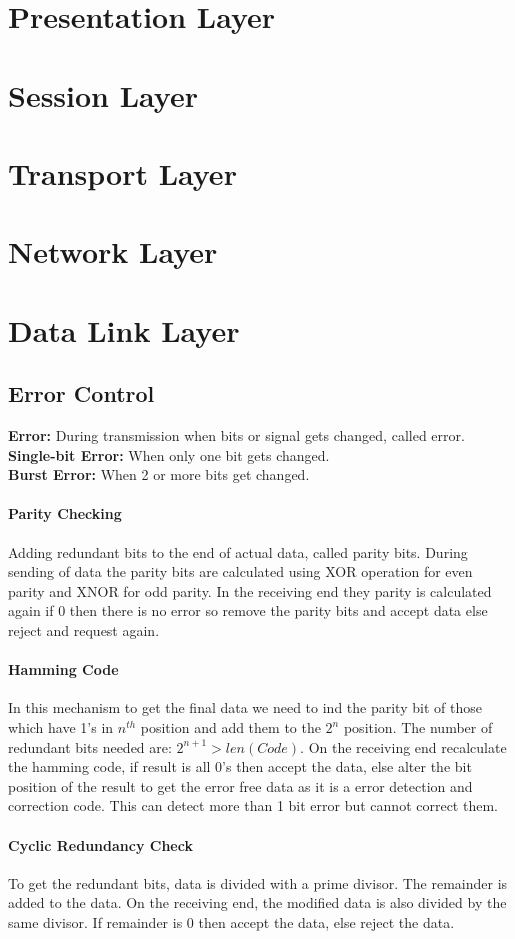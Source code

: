 \section{Presentation Layer}
\section{Session Layer}
\section{Transport Layer}
\section{Network Layer}
\section{Data Link Layer}
\subsection{Error Control}
\textbf{Error:} During transmission when bits or signal gets changed, called error.\\
\textbf{Single-bit Error:} When only one bit gets changed.\\
\textbf{Burst Error:} When 2 or more bits get changed.
\paragraph{Parity Checking} Adding redundant bits to the end of actual data, called parity bits. During sending of data the parity bits are calculated using XOR operation for even parity and XNOR for odd parity. In the receiving end they parity is calculated again if 0 then there is no error so remove the parity bits and accept data else reject and request again.
\paragraph{Hamming Code} In this mechanism to get the final data we need to ind the parity bit of those which have 1's in $n^{th}$ position and add them to the $2^n$ position. The number of redundant bits needed are: $2^{n+1} > len(Code)$. On the receiving end recalculate the hamming code, if result is all 0's then accept the data, else alter the bit position of the result to get the error free data as it is a error detection and correction code. This can detect more than 1 bit error but cannot correct them.
\paragraph{Cyclic Redundancy Check} To get the redundant bits, data is divided with a prime divisor. The remainder is added to the data. On the receiving end, the modified data is also divided by the same divisor. If remainder is 0 then accept the data, else reject the data.
